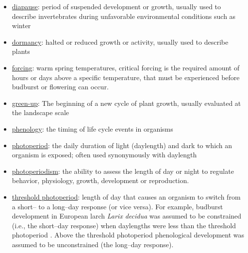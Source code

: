 \documentclass{article}
\begin{document}
\begin{itemize}
\item \underline{diapause}: period of suspended development or growth, usually used to describe invertebrates during unfavorable environmental conditions such as winter
\item \underline{dormancy}: halted or reduced growth or activity, usually used to describe plants
\item \underline{forcing}: warm spring temperatures, critical forcing is the required amount of hours or days above a specific temperature, that must be experienced before budburst or flowering can occur.
\item \underline{green-up}: The beginning of a new cycle of plant growth, usually evaluated at the landscape scale
\item \underline{phenology}: the timing of life cycle events in organisms
\item \underline{photoperiod}: the daily duration of light (daylength) and dark to which an organism is exposed; often used synonymously with daylength
\item \underline{photoperiodism}: the ability to assess the length of day or night to regulate behavior, physiology, growth, development or reproduction.
\item \underline{threshold photoperiod}: length of day that causes an organism to switch from a short-- to a long--day response (or vice versa). For example, budburst development in European larch \emph{Larix decidua} was assumed to be constrained (i.e., the short--day response) when daylengths were less than the threshold photoperiod \citep[10-11 hours according to one model in ][]{migliavacca2008}. Above the threshold photoperiod phenological development was assumed to be unconstrained (the long--day response).
\end{itemize}
\end{document}
